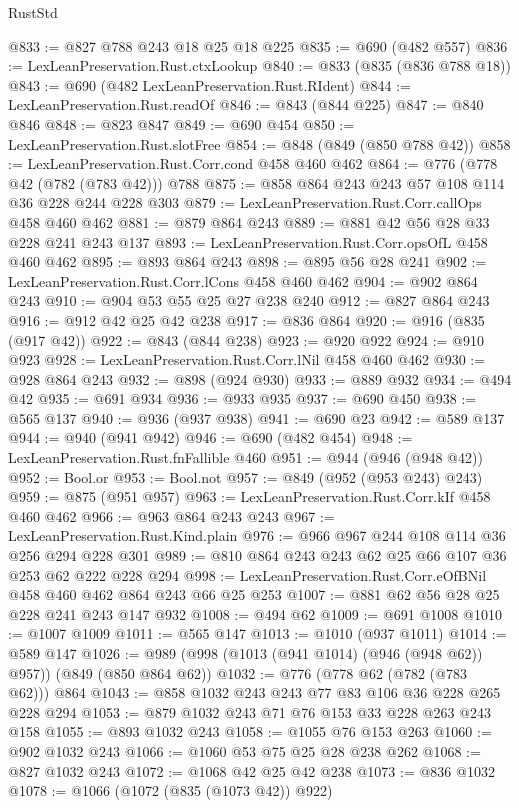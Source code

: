 \begin{lexlean}{RustStd}
\begin{coremodule}
@833 := @827 @788 @243 @18 @25 @18 @225
@835 := @690 (@482 @557)
@836 := LexLeanPreservation.Rust.ctxLookup
@840 := @833 (@835 (@836 @788 @18))
@843 := @690 (@482 LexLeanPreservation.Rust.RIdent)
@844 := LexLeanPreservation.Rust.readOf
@846 := @843 (@844 @225)
@847 := @840 @846
@848 := @823 @847
@849 := @690 @454
@850 := LexLeanPreservation.Rust.slotFree
@854 := @848 (@849 (@850 @788 @42))
@858 := LexLeanPreservation.Rust.Corr.cond @458 @460 @462
@864 := @776 (@778 @42 (@782 (@783 @42))) @788
@875 := @858 @864 @243 @243 @57 @108 @114 @36 @228 @244 @228 @303
@879 := LexLeanPreservation.Rust.Corr.callOps @458 @460 @462
@881 := @879 @864 @243
@889 := @881 @42 @56 @28 @33 @228 @241 @243 @137
@893 := LexLeanPreservation.Rust.Corr.opsOfL @458 @460 @462
@895 := @893 @864 @243
@898 := @895 @56 @28 @241
@902 := LexLeanPreservation.Rust.Corr.lCons @458 @460 @462
@904 := @902 @864 @243
@910 := @904 @53 @55 @25 @27 @238 @240
@912 := @827 @864 @243
@916 := @912 @42 @25 @42 @238
@917 := @836 @864
@920 := @916 (@835 (@917 @42))
@922 := @843 (@844 @238)
@923 := @920 @922
@924 := @910 @923
@928 := LexLeanPreservation.Rust.Corr.lNil @458 @460 @462
@930 := @928 @864 @243
@932 := @898 (@924 @930)
@933 := @889 @932
@934 := @494 @42
@935 := @691 @934
@936 := @933 @935
@937 := @690 @450
@938 := @565 @137
@940 := @936 (@937 @938)
@941 := @690 @23
@942 := @589 @137
@944 := @940 (@941 @942)
@946 := @690 (@482 @454)
@948 := LexLeanPreservation.Rust.fnFallible @460
@951 := @944 (@946 (@948 @42))
@952 := Bool.or
@953 := Bool.not
@957 := @849 (@952 (@953 @243) @243)
@959 := @875 (@951 @957)
@963 := LexLeanPreservation.Rust.Corr.kIf @458 @460 @462
@966 := @963 @864 @243 @243
@967 := LexLeanPreservation.Rust.Kind.plain
@976 := @966 @967 @244 @108 @114 @36 @256 @294 @228 @301
@989 := @810 @864 @243 @243 @62 @25 @66 @107 @36 @253 @62 @222 @228 @294
@998 := LexLeanPreservation.Rust.Corr.eOfBNil @458 @460 @462 @864 @243 @66 @25 @253
@1007 := @881 @62 @56 @28 @25 @228 @241 @243 @147 @932
@1008 := @494 @62
@1009 := @691 @1008
@1010 := @1007 @1009
@1011 := @565 @147
@1013 := @1010 (@937 @1011)
@1014 := @589 @147
@1026 := @989 (@998 (@1013 (@941 @1014) (@946 (@948 @62)) @957)) (@849 (@850 @864 @62))
@1032 := @776 (@778 @62 (@782 (@783 @62))) @864
@1043 := @858 @1032 @243 @243 @77 @83 @106 @36 @228 @265 @228 @294
@1053 := @879 @1032 @243 @71 @76 @153 @33 @228 @263 @243 @158
@1055 := @893 @1032 @243
@1058 := @1055 @76 @153 @263
@1060 := @902 @1032 @243
@1066 := @1060 @53 @75 @25 @28 @238 @262
@1068 := @827 @1032 @243
@1072 := @1068 @42 @25 @42 @238
@1073 := @836 @1032
@1078 := @1066 (@1072 (@835 (@1073 @42)) @922)

\end{coremodule}
\end{lexlean}
